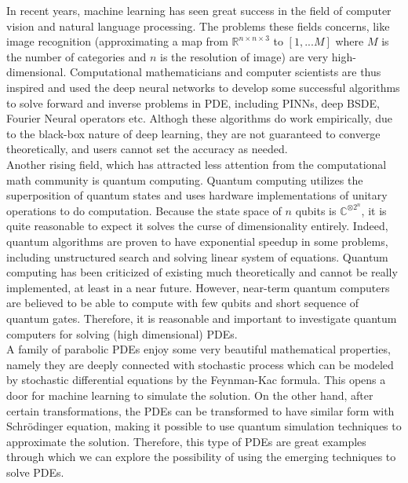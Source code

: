 \documentclass[11pt]{article}
\newcommand{\C}{{\mathbb{C}}}
\newcommand{\R}{{\mathbb{R}}}
\theoremstyle{definition}
\begin{document}
In recent years, machine learning has seen great success in the field of computer vision and natural language processing. The problems these fields concerns, like image recognition (approximating a map from $\R^{n\times n \times 3}$ to $\left[1,...M \right]$ where $M$ is the number of categories and $n$ is the resolution of image) are very high-dimensional. Computational mathematicians and computer scientists are thus inspired and used the deep neural networks to develop some successful algorithms to solve forward and inverse problems in PDE, including PINNs\cite{raissi_physics_2017}, deep BSDE\cite{han_solving_2018}, Fourier Neural operators\cite{li_fourier_2021} etc. Althogh these algorithms do work empirically, due to the black-box nature of deep learning, they are not guaranteed to converge theoretically, and users cannot set the accuracy as needed.\\

Another rising field\cite{childs_high-precision_2021}\cite{leong_variational_2022}\cite{yuan_theory_2019}, which has attracted less attention from the computational math community is quantum computing. Quantum computing utilizes the superposition of quantum states and uses hardware implementations of unitary operations to do computation. Because the state space of $n$ qubits is  $\C^{\otimes2^n}$, it is quite reasonable to expect it solves the curse of dimensionality entirely. Indeed, quantum algorithms are proven to have exponential speedup in some problems, including unstructured search and solving linear system of equations. Quantum computing has been criticized of existing much theoretically and cannot be really implemented, at least in a near future. However, near-term quantum computers are believed to be able to compute with few qubits and short sequence of quantum gates. Therefore, it is reasonable and important to investigate quantum computers for solving (high dimensional) PDEs.\\

A family of parabolic PDEs enjoy some very beautiful mathematical properties, namely they are deeply connected with stochastic process which can be modeled by stochastic differential equations by the Feynman-Kac formula\cite{e_applied_2019}. This opens a door for machine learning to simulate the solution. On the other hand, after certain transformations, the PDEs can be transformed to have similar form with Schrödinger equation, making it possible to use quantum simulation techniques to approximate the solution. Therefore, this type of PDEs are great examples through which we can explore the possibility of using the emerging techniques to solve PDEs.\\
\end{document}
